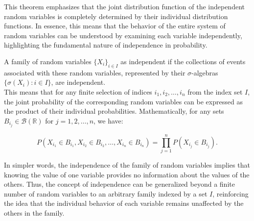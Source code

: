 This theorem emphasizes that the joint distribution function of the independent random variables is completely determined by their individual distribution functions. In essence, this means that the behavior of the entire system of random variables can be understood by examining each variable independently, highlighting the fundamental nature of independence in probability.

\begin{definition}
A family of random variables \(\{X_i\}_{i \in I}\) as independent if the collections of events associated with these random variables, represented by their \(\sigma\)-algebras \(\{\sigma(X_i) : i \in I\}\), are independent. \\

This means that for any finite selection of indices \(i_1, i_2, \ldots, i_n\) from the index set \(I\), the joint probability of the corresponding random variables can be expressed as the product of their individual probabilities. Mathematically, for any sets \(B_{i_j} \in \mathcal{B}(\mathbb{R})\) for \(j = 1, 2, \ldots, n\), we have:

\[
P(X_{i_1} \in B_{i_1}, X_{i_2} \in B_{i_2}, \ldots, X_{i_n} \in B_{i_n}) = \prod_{j=1}^{n} P(X_{i_j} \in B_{i_j}).
\]
\end{definition}


In simpler words, the independence of the family of random variables implies that knowing the value of one variable provides no information about the values of the others. Thus, the concept of independence can be generalized beyond a finite number of random variables to an arbitrary family indexed by a set \(I\), reinforcing the idea that the individual behavior of each variable remains unaffected by the others in the family.